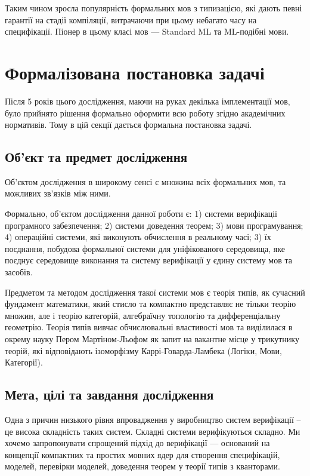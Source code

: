 Таким чином зросла популярність формальних мов з типизацією, які дають певні гарантії
на стадії компіляції, витрачаючи при цьому небагато часу на специфікації. Піонер в цьому класі
мов --- Standard ML та ML-подібні мови.

\section{Формалізована постановка задачі}
Після 5 років цього дослідження, маючи на руках декілька імплементації мов,
було прийнято рішення формально оформити всю роботу згідно академічних нормативів.
Тому в цій секції дається формальна постановка задачі.

\subsection{Об'єкт та предмет дослідження}
Об'єктом дослідження в широкому сенсі є множина
всіх формальних мов, та можливих зв'язків між ними.

Формально, об'єктом дослідження данної роботи є:
1) системи верифікації програмного забезпечення;
2) системи доведення теорем;
3) мови програмування;
4) операційні системи, які виконують обчислення в реальному часі;
3) їх поєднання, побудова формальної системи для
уніфікованого середовища, яке поєднує середовище
виконання та систему верифікації у єдину систему мов та засобів.

Предметом та методом дослідження такої системи мов є теорія типів,
як сучасний фундамент математики,
який стисло та компактно представляє не тільки теорію множин,
але і теорію категорій, алгебраїчну топологію та дифференціальну геометрію.
Теорія типів вивчає обчислювальні властивості мов та виділилася
в окрему науку Пером Мартіном-Льофом як запит на вакантне місце у
трикутнику теорій, які відповідають ізоморфізму
Каррі-Говарда-Ламбека (Логіки, Мови, Категорії).

\subsection{Мета, цілі та завдання дослідження}
Одна з причин низького рівня впровадження у виробництво систем
верифікації -- це висока складність таких систем. Складні системи
верифікуються складно. Ми хочемо запропонувати спрощений
підхід до верифікації --- оснований на концепції компактних
та простих мовних ядер для створення специфікацій, моделей,
перевірки моделей, доведення теорем у теорії типів з кванторами.

